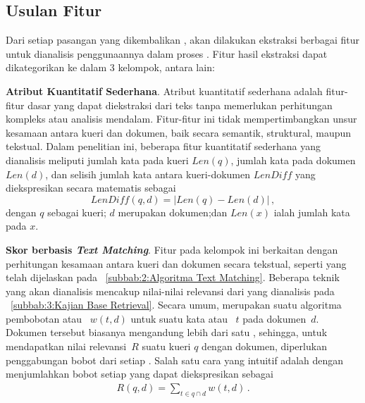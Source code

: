 \subsection{Usulan Fitur}
\label{subbab:3:Usulan Fitur}
Dari setiap pasangan yang dikembalikan \base{} \retriever{}, akan dilakukan ekstraksi berbagai fitur untuk dianalisis penggunaannya dalam proses \reranking{}. Fitur hasil ekstraksi dapat dikategorikan ke dalam 3 kelompok, antara lain:

\vspace{2mm}
\noindent{}\textbf{Atribut Kuantitatif Sederhana}. Atribut kuantitatif sederhana adalah fitur-fitur dasar yang dapat diekstraksi dari teks tanpa memerlukan perhitungan kompleks atau analisis mendalam. Fitur-fitur ini tidak mempertimbangkan unsur kesamaan antara kueri dan dokumen, baik secara semantik, struktural, maupun tekstual. Dalam penelitian ini, beberapa fitur kuantitatif sederhana yang dianalisis meliputi jumlah kata pada kueri \(Len(q)\), jumlah kata pada dokumen \(Len(d)\), dan selisih jumlah kata antara kueri-dokumen \(LenDiff\) yang diekspresikan secara matematis sebagai
\[LenDiff(q,d)=|Len(q)-Len(d)| \, ,\]
dengan $q$ sebagai kueri; $d$ merupakan dokumen;dan $Len(x)$ ialah jumlah kata pada $x$.

\vspace{2mm}
\noindent{}\textbf{Skor berbasis \textit{Text Matching}}. Fitur pada kelompok ini berkaitan dengan perhitungan kesamaan antara kueri dan dokumen secara tekstual, seperti yang telah dijelaskan pada \subbab{}~\ref{subbab:2:Algoritma Text Matching}. Beberapa teknik yang akan dianalisis mencakup nilai-nilai relevansi dari \base{} \retriever{} yang dianalisis pada \subbab{}~\ref{subbab:3:Kajian Base Retrieval}. Secara umum, \base{} \retriever{} merupakan suatu algoritma pembobotan atau \weighting{}~\(w(t,d)\) untuk suatu kata atau \term{}~\(t\) pada dokumen~\(d\). Dokumen tersebut biasanya mengandung lebih dari satu \term{}, sehingga, untuk mendapatkan nilai relevansi~\(R\) suatu kueri \(q\) dengan dokumen, diperlukan penggabungan bobot dari setiap \term{}. Salah satu cara yang intuitif adalah dengan menjumlahkan bobot setiap \term{} yang dapat diekspresikan sebagai
\begin{align*}
    R(q,d)=\sum_{t\in{}q\cap{}d}w(t,d) \, .
\end{align*}
    
